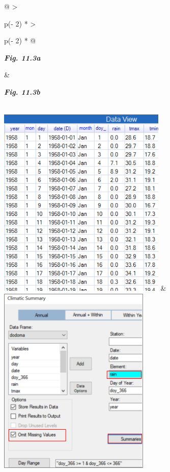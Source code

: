 \documentclass[
  letterpaper,
  DIV=11,
  numbers=noendperiod]{scrreprt}
\begin{document}
\begin{longtable}[]{@{}
  >{\raggedright\arraybackslash}p{(\columnwidth - 2\tabcolsep) * }
  >{\raggedright\arraybackslash}p{(\columnwidth - 2\tabcolsep) * }@{}}
\toprule\noalign{}
\begin{minipage}[b]{\linewidth}\raggedright
\textbf{\emph{Fig. 11.3a}}
\end{minipage} & \begin{minipage}[b]{\linewidth}\raggedright
\textbf{\emph{Fig. 11.3b}}
\end{minipage} \\
\midrule\noalign{}
\endhead
\bottomrule\noalign{}
\endlastfoot
\includegraphics[width=3.15337in,height=3.60962in]{figures/Fig11.3a.png}
&
\includegraphics[width=2.8408in,height=3.59358in]{figures/Fig11.3b.png} \\
\end{longtable}
\end{document}
